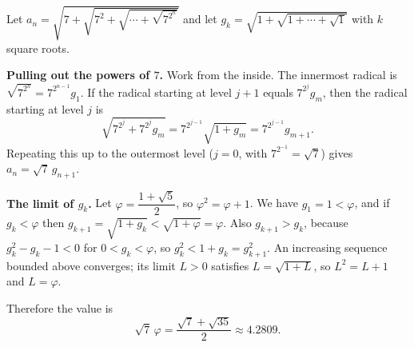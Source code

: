 Let $a_n=\sqrt{7+\sqrt{7^2+\sqrt{\cdots+\sqrt{7^{2^n}}}}}$ and let $g_k=\sqrt{1+\sqrt{1+\cdots+\sqrt{1}}}$ with $k$ square roots.

\textbf{Pulling out the powers of $7$.} Work from the inside. The innermost radical is $\sqrt{7^{2^n}}=7^{2^{n-1}}g_1$. If the radical starting at level $j+1$ equals $7^{2^{j}}g_m$, then the radical starting at level $j$ is
\[
\sqrt{7^{2^j}+7^{2^j}g_m}=7^{2^{j-1}}\sqrt{1+g_m}=7^{2^{j-1}}g_{m+1}.
\]
Repeating this up to the outermost level ($j=0$, with $7^{2^{-1}}=\sqrt7$) gives $a_n=\sqrt7\,g_{n+1}$.

\textbf{The limit of $g_k$.} Let $\varphi=\dfrac{1+\sqrt5}{2}$, so $\varphi^2=\varphi+1$. We have $g_1=1<\varphi$, and if $g_k<\varphi$ then $g_{k+1}=\sqrt{1+g_k}<\sqrt{1+\varphi}=\varphi$. Also $g_{k+1}>g_k$, because $g_k^2-g_k-1<0$ for $0<g_k<\varphi$, so $g_k^2<1+g_k=g_{k+1}^2$. An increasing sequence bounded above converges; its limit $L>0$ satisfies $L=\sqrt{1+L}$, so $L^2=L+1$ and $L=\varphi$.

Therefore the value is
\[
\sqrt7\,\varphi=\boxed{\dfrac{\sqrt7+\sqrt{35}}{2}}\approx4.2809 .
\]
